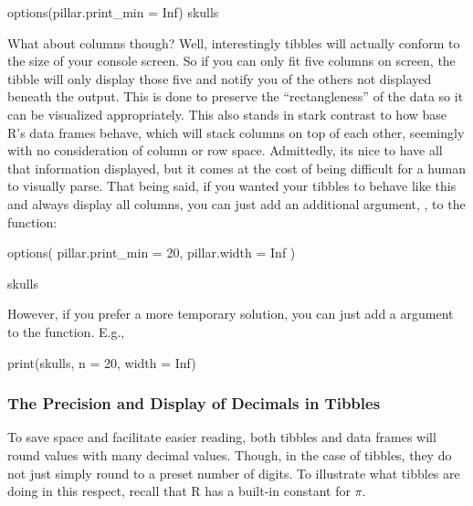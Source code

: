 \begin{inR}
options(pillar.print_min = Inf)
skulls
\end{inR}

\vspace{1em}

What about columns though? Well, interestingly tibbles will actually conform to the size of your console screen.  So if you can only fit five columns on screen, the tibble will only display those five and notify you of the others not displayed beneath the output. This is done to preserve the ``rectangleness'' of the data so it can be visualized appropriately. This also stands in stark contrast to how base R's data frames behave, which will stack columns on top of each other, seemingly with no consideration of column or row space. Admittedly, its nice to have all that information displayed, but it comes at the cost of being difficult for a human to visually parse. That being said, if you wanted your tibbles to behave like this and always display all columns, you can just add an additional argument, , to the  function:

\begin{inR}
options(
  pillar.print_min = 20,
  pillar.width = Inf
)

skulls
\end{inR}

\vspace{1em}

\noindent
However, if you prefer a more temporary solution, you can just add a  argument to the  function. E.g., 

\begin{inR}
print(skulls, n = 20, width = Inf)
\end{inR}

\vspace{1em}

\subsubsection{The Precision and Display of Decimals in Tibbles}
\label{sec:sig_digs}

To save space and facilitate easier reading, both tibbles and data frames will round values with many decimal values. Though, in the case of tibbles, they do not just simply round to a preset number of digits.  To illustrate what tibbles are doing in this respect, recall that R has a built-in constant for $\pi$.

